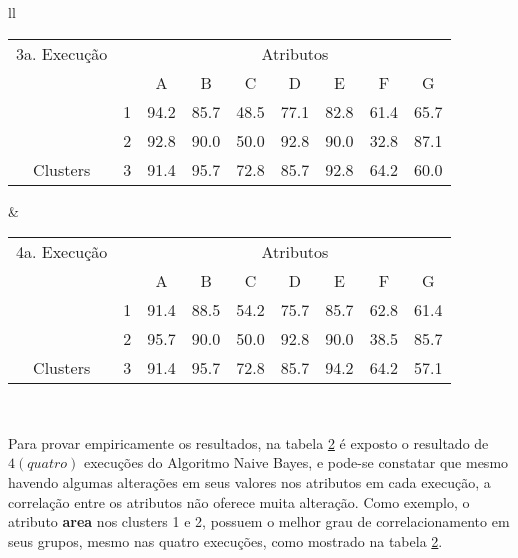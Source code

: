 \begin{table}[!h]
\begin{tabular}{ll}
   \small\addtolength{\tabcolsep}{-5pt}
   \begin{tabular}{|cl|c|c|c|c|c|c|c|}
        \hline \hline
          {\tiny 3a. Execução}     &   & \multicolumn{7}{c|}{Atributos}                                               \\ \cline{3-9} 
       \multicolumn{1}{|l}{}                            &   & A    & B & C & D & E & F & G \\ \hline
        \multicolumn{1}{|c|}{}                           & 1 & 94.2 & 85.7   & 48.5      & 77.1 & 82.8 & 61.4   & 65.7   \\ \cline{2-9} 
        \multicolumn{1}{|c|}{}                           & 2 & 92.8 & 90.0   & 50.0      & 92.8 & 90.0 & 32.8  & 87.1  \\ \cline{2-9} 
        \multicolumn{1}{|c|}{\multirow{-3}{*}{Clusters}} & 3 & 91.4 & 95.7   & 72.8      & 85.7 & 92.8 & 64.2  & 60.0  \\ \hline
   \end{tabular}
    
    &
    
       \small\addtolength{\tabcolsep}{-5pt}
   \begin{tabular}{|cl|c|c|c|c|c|c|c|}
        \hline \hline
            {\tiny 4a. Execução }   &   & \multicolumn{7}{c|}{Atributos}                                               \\ \cline{3-9} 
       \multicolumn{1}{|l}{}                            &   & A    & B & C & D & E & F & G \\ \hline
        \multicolumn{1}{|c|}{}                           & 1 & 91.4 & 88.5   & 54.2      & 75.7 & 85.7 & 62.8   & 61.4   \\ \cline{2-9} 
        \multicolumn{1}{|c|}{}                           & 2 & 95.7 & 90.0   & 50.0      & 92.8 & 90.0 & 38.5  & 85.7  \\ \cline{2-9} 
        \multicolumn{1}{|c|}{\multirow{-3}{*}{Clusters}} & 3 & 91.4 & 95.7   & 72.8      & 85.7 & 94.2 & 64.2  & 57.1  \\ \hline
   \end{tabular}
   \\
 
 \end{tabular}
 \label{tab:execucoes:seed:nb}
\end{table}

Para provar empiricamente os resultados, na tabela \ref{tab:execucoes:seed:nb} é exposto o resultado de ${4(quatro)}$ execuções do Algoritmo Naive Bayes, e pode-se constatar que mesmo havendo algumas alterações em seus valores nos atributos em cada execução, a correlação entre os atributos não oferece muita alteração. Como exemplo, o atributo \textbf{area} nos clusters 1 e 2, possuem o melhor grau de correlacionamento em seus grupos, mesmo nas quatro execuções, como mostrado na tabela \ref{tab:execucoes:seed:nb}.

